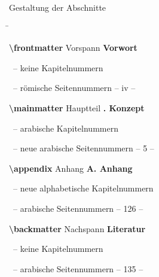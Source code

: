\begin{frame}[fragile]{Gestaltung der Abschnitte}
  \begin{tabbing}
    \hskip8cm \= \kill

    \textcolor{texcs}{\ttfamily\bfseries\textbackslash frontmatter} Vorspann
        \> \textcolor{examplecolor}{\bfseries\sffamily Vorwort}\\
      \strut\ \textcolor{maincolor}{--} keine Kapitelnummern\\
      \strut\ \textcolor{maincolor}{--} römische Seitennummern
        \> \textcolor{examplecolor}{\rmfamily \qquad -- iv --} \\[3ex]

    \pause

    \textcolor{texcs}{\ttfamily\bfseries\textbackslash mainmatter} Hauptteil
        \> \textcolor{examplecolor}{\bfseries{}. Konzept}\\
      \strut\ \textcolor{maincolor}{--} arabische Kapitelnummern\\
      \strut\ \textcolor{maincolor}{--} \alert{neue} arabische Seitennummern
        \> \textcolor{examplecolor}{\rmfamily \qquad -- 5 --} \\[3ex]

    \pause

    \textcolor{texcs}{\ttfamily\bfseries\textbackslash appendix} Anhang
        \> \textcolor{examplecolor}{\bfseries\sffamily A. Anhang}\\
      \strut\ \textcolor{maincolor}{--} \alert{neue} alphabetische Kapitelnummern\\
      \strut\ \textcolor{maincolor}{--} arabische Seitennummern
        \> \textcolor{examplecolor}{\rmfamily \qquad -- 126 --} \\[3ex]

    \pause

    \textcolor{texcs}{\ttfamily\bfseries\textbackslash backmatter} Nachspann
        \> \textcolor{examplecolor}{\bfseries\sffamily Literatur}\\
      \strut\ \textcolor{maincolor}{--} keine Kapitelnummern\\
      \strut\ \textcolor{maincolor}{--} arabische Seitennummern
        \> \textcolor{examplecolor}{\rmfamily \qquad -- 135 --}
  \end{tabbing}
\end{frame}

